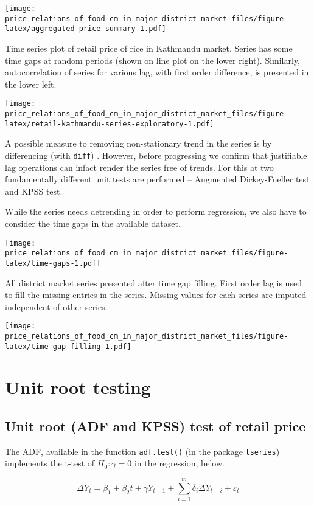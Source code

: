 \documentclass[12pt,]{article}
\begin{document}
\texttt{[image: price\_relations\_of\_food\_cm\_in\_major\_district\_market\_files/figure-latex/aggregated-price-summary-1.pdf]}

Time series plot of retail price of rice in Kathmandu market. Series has some time gaps at random periods (shown on line plot on the lower right). Similarly, autocorrelation of series for various lag, with first order difference, is presented in the lower left.

\texttt{[image: price\_relations\_of\_food\_cm\_in\_major\_district\_market\_files/figure-latex/retail-kathmandu-series-exploratory-1.pdf]}

A possible measure to removing non-stationary trend in the series is by differencing (with \texttt{diff}) . However, before progressing we confirm that justifiable lag operations can infact render the series free of trends. For this at two fundamentally different unit tests are performed -- Augmented Dickey-Fueller test and KPSS test.

While the series needs detrending in order to perform regression, we also have to consider the time gaps in the available dataset.

\texttt{[image: price\_relations\_of\_food\_cm\_in\_major\_district\_market\_files/figure-latex/time-gaps-1.pdf]}

All district market series presented after time gap filling. First order lag is used to fill the missing entries in the series. Missing values for each series are imputed independent of other series.

\texttt{[image: price\_relations\_of\_food\_cm\_in\_major\_district\_market\_files/figure-latex/time-gap-filling-1.pdf]}

\hypertarget{unit-root-testing}{%
\section{Unit root testing}\label{unit-root-testing}}

\hypertarget{unit-root-adf-and-kpss-test-of-retail-price}{%
\subsection{Unit root (ADF and KPSS) test of retail price}\label{unit-root-adf-and-kpss-test-of-retail-price}}

The ADF, available in the function \texttt{adf.test()} (in the package \texttt{tseries}) implements the t-test of \(H_0: \gamma = 0\) in the regression, below.

\[
  \Delta {{Y}_{t}}={{\beta
  }_{1}}+{{\beta }_{2}}t+\gamma {{Y}_{t-1}}+ \sum\limits_{i=1}^{m}{\delta_i \Delta
    {{Y}_{t-i}}+{{\varepsilon }_{t}}}
\]
\end{document}
